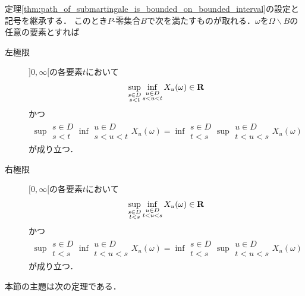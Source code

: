 	\begin{screen}
		\begin{thm}[劣マルチンゲールの殆ど全てのパスが各点で実数値の左極限及び右極限を持つ]
		\label{thm:almost_all_paths_of_submartingale_have_left_and_right_limits}
			定理\ref{thm:path_of_submartingale_is_bounded_on_bounded_interval}の設定と記号を継承する．
			このとき$P$-零集合$B$で次を満たすものが取れる．$\omega$を$\Omega \backslash B$の任意の要素とすれば
			\begin{description}
				\item[左極限] $]0,\infty[$の各要素$t$において
					\begin{align}
						\operatorname*{sup}_{\substack{s \in D \\ s < t}} \operatorname*{inf}_{\substack{u \in D \\ s < u < t}} X_u(\omega) \in \mathbf{R}
					\end{align}
					かつ
					\begin{align}
						\sup{\substack{s \in D \\ s < t}}{\inf{\substack{u \in D \\ s < u < t}}{X_u(\omega)}} 
						= \inf{\substack{s \in D \\ t < s}}{\sup{\substack{u \in D \\ t < u < s}}{X_u(\omega)}}
					\end{align}
					が成り立つ．
				
				\item[右極限] $[0,\infty[$の各要素$t$において
					\begin{align}
						\operatorname*{sup}_{\substack{s \in D \\ t < s}} \operatorname*{inf}_{\substack{u \in D \\ t < u < s}} X_u(\omega) \in \mathbf{R}
					\end{align}
					かつ
					\begin{align}
						\sup{\substack{s \in D \\ t < s}}{\inf{\substack{u \in D \\ t < u < s}}{X_u(\omega)}} 
						= \inf{\substack{s \in D \\ t < s}}{\sup{\substack{u \in D \\ t < u < s}}{X_u(\omega)}}
					\end{align}
					が成り立つ．
			\end{description}
		\end{thm}
	\end{screen}
	
	本節の主題は次の定理である．
	
